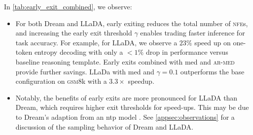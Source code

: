 In \cref{tab:early_exit_combined}, we observe:
\begin{itemize}[leftmargin=*]
    \item For both Dream and LLaDA, early exiting reduces the total number of \textsc{nfe}s, and increasing the early exit threshold $\gamma$ enables trading faster inference for task accuracy. For example, for LLaDA, we observe a $23\%$ speed up on one-token entropy decoding with only a  $<1\%$ drop in performance versus baseline reasoning template. Early exits combined with \gls{med} and \textsc{ar-med} provide further savings.  LLaDa with \gls{med} and $\gamma=0.1$ outperforms the base configuration on \textsc{gsm8}k with a $3.3\times$ speedup.

    \item Notably, the benefits of early exits are more pronounced for LLaDA than Dream, which requires higher exit thresholds for speed-ups. This may be due to Dream's adaption from an \gls{ntp} model \citep{gong2024scaling,dream2025}. See \cref{appsec:observations} for a discussion of the sampling behavior of Dream and LLaDA. 
\end{itemize}


